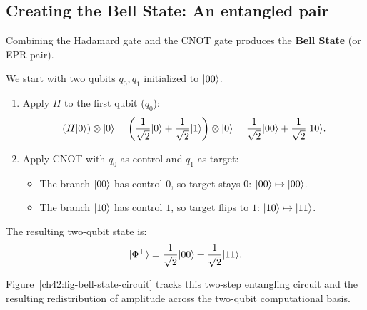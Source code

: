 \subsection{Creating the Bell State: An entangled pair}

Combining the Hadamard gate and the CNOT gate produces the \textbf{Bell State} (or EPR pair).

We start with two qubits $q_0, q_1$ initialized to $\lvert 00 \rangle$.
\begin{enumerate}
  \item Apply $H$ to the first qubit ($q_0$):
  \[
    (H\lvert 0 \rangle) \otimes \lvert 0 \rangle
    = \left(\frac{1}{\sqrt{2}}\lvert 0 \rangle + \frac{1}{\sqrt{2}}\lvert 1 \rangle\right) \otimes \lvert 0 \rangle
    = \frac{1}{\sqrt{2}}\lvert 00 \rangle + \frac{1}{\sqrt{2}}\lvert 10 \rangle.
  \]
  \item Apply CNOT with $q_0$ as control and $q_1$ as target:
  \begin{itemize}
    \item The branch $\lvert 00 \rangle$ has control $0$, so target stays $0$: $\lvert 00 \rangle \mapsto \lvert 00 \rangle$.
    \item The branch $\lvert 10 \rangle$ has control $1$, so target flips to $1$: $\lvert 10 \rangle \mapsto \lvert 11 \rangle$.
  \end{itemize}
\end{enumerate}
The resulting two-qubit state is:
\[
  \lvert \Phi^+ \rangle = \frac{1}{\sqrt{2}}\lvert 00 \rangle + \frac{1}{\sqrt{2}}\lvert 11 \rangle.
\]

Figure~\ref{ch42:fig-bell-state-circuit} tracks this two-step entangling circuit and the resulting redistribution of amplitude across the two-qubit computational basis.

